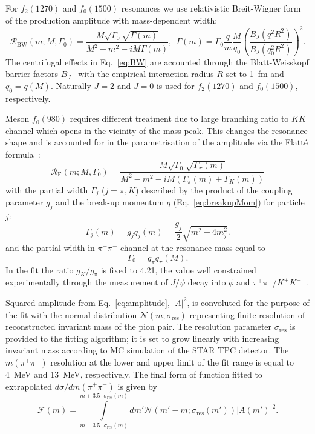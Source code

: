 For $f_2(1270)$ and $f_0(1500)$ resonances we use relativistic Breit-Wigner form of the production amplitude with mass-dependent width:
\begin{equation}\label{eq:BW}\mathcal{R}_{\textrm{BW}}(m;M,\Gamma_{0}) = \frac{M\sqrt{\Gamma_{0}}\sqrt{\Gamma(m)}}{M^{2}-m^{2}-i M\Gamma(m)},~~\Gamma(m) = \Gamma_{0}\frac{q}{m}\frac{M}{q_{0}}\left(\frac{B_{J}(q^{2}R^{2})}{B_{J}(q_{0}^{2}R^{2})}\right)^{2}.\end{equation}
The centrifugal effects in Eq.~\eqref{eq:BW} are accounted through the Blatt-Weisskopf barrier factors $B_{J}$~\cite{BarrierFactors} with the empirical interaction radius $R$ set to 1~fm and $q_{0} = q(M)$. Naturally $J=2$ and $J=0$ is used for $f_2(1270)$ and $f_0(1500)$, respectively.

Meson $f_0(980)$ requires different treatment due to large branching ratio to $K\bar{K}$ channel which opens in the vicinity of the mass peak. This changes the resonance shape and is accounted for in the parametrisation of the amplitude via the Flatt\'e formula~\cite{Flatte}:
\begin{equation}\label{eq:Flatte}\mathcal{R}_{\textrm{F}}(m;M,\Gamma_{0}) = \frac{M\sqrt{\Gamma_{0}}\sqrt{\Gamma_{\pi}(m)}}{M^{2}-m^{2}-i M\left(\Gamma_{\pi}(m)+\Gamma_{K}(m)\right)}\end{equation}
%
with the partial width $\Gamma_{j}$ ($j=\pi, K$) described by the product of the coupling parameter $g_{j}$ and the break-up momentum $q$ (Eq.~\eqref{eq:breakupMom}) for particle $j$:
\begin{equation}
    \Gamma_{j}(m) = g_{j}q_{j}(m) = \frac{g_{j}}{2}\sqrt{m^{2}-4m_{j}^{2}}.
\end{equation} and the partial width in $\pi^{+}\pi^{-}$ channel at the resonance mass equal to
\begin{equation}
    \Gamma_{0} = g_{\pi}q_{\pi}(M).
\end{equation}
In the fit the ratio $g_{K}/g_{\pi}$ is fixed to 4.21, the value well constrained experimentally through the measurement of $J/\psi$ decay into $\phi$ and $\pi^{+}\pi^{-}$/$K^{+}K^{-}$~\cite{BES_JPsi}.
%

Squared amplitude from Eq.~\eqref{eq:amplitude}, $|A|^{2}$, is convoluted for the purpose of the fit with the normal distribution $\mathcal{N}(m; \sigma_{\text{res}})$ representing finite resolution of reconstructed invariant mass of the pion pair. The resolution parameter $\sigma_{\text{res}}$ is provided to the fitting algorithm; it is set to grow linearly with increasing invariant mass according to MC simulation of the STAR TPC detector. The $m(\pi^{+}\pi^{-})$ resolution at the lower and upper limit of the fit range is equal to 4~MeV and 13~MeV, respectively. The final form of function fitted to extrapolated $d\sigma/dm(\pi^{+}\pi^{-})$ is given by
\begin{equation}
    \mathcal{F}(m) = \int\limits_{m-3.5\cdot\sigma_{\text{res}}(m)}^{m+3.5\cdot\sigma_{\text{res}}(m)}dm'\mathcal{N}\left(m'-m; \sigma_{\text{res}}(m')\right)|A(m')|^{2}.
\end{equation}

